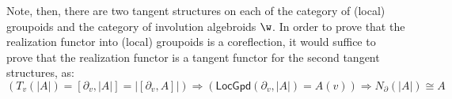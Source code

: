 Note, then, there are two tangent structures on each of the category of (local) groupoids and the category of involution algebroids $\w$.
In order to prove that the realization functor into (local) groupoids is a coreflection, it would suffice to prove that the realization functor is a tangent functor for the second tangent structures, as:
\[
    \left(T_v(|A|) = [\partial_v, |A|] = |[\partial_v,A]| \right) \Rightarrow 
    \left(\mathsf{LocGpd}(\partial_v, |A|) = A(v)\right) \Rightarrow
    N_\partial(|A|) \cong A
\]
%	
%



% 
